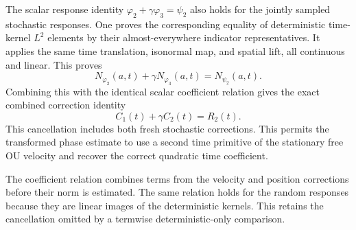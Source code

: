 \documentclass[11pt,a4paper]{article}
\begin{document}
The scalar response identity \(\varphi_2+\gamma\varphi_3=\psi_2\) also holds for the jointly sampled stochastic responses. One proves the corresponding equality of deterministic time-kernel \(L^{2}\) elements by their almost-everywhere indicator representatives. It applies the same time translation, isonormal map, and spatial lift, all continuous and linear. This proves \[N_{\varphi_2}(a,t)+\gamma N_{\varphi_3}(a,t)=N_{\psi_2}(a,t).\] Combining this with the identical scalar coefficient relation gives the exact combined correction identity \[C_1(t)+\gamma C_2(t)=R_2(t).\] This cancellation includes both fresh stochastic corrections. This permits the transformed phase estimate to use a second time primitive of the stationary free OU velocity and recover the correct quadratic time coefficient.



The coefficient relation combines terms from the velocity and position corrections before their norm is estimated. The same relation holds for the random responses because they are linear images of the deterministic kernels. This retains the cancellation omitted by a termwise deterministic-only comparison.
\end{document}

